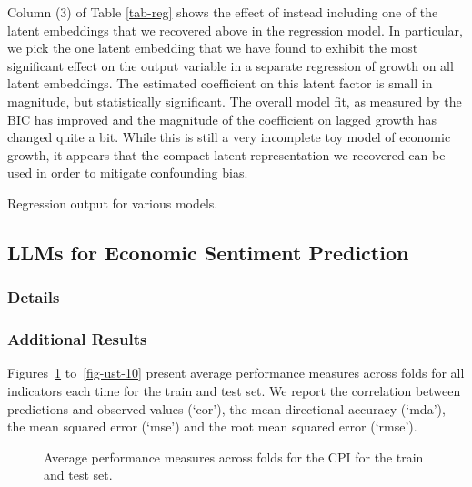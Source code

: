 \documentclass{article}
\theoremstyle{plain}
\theoremstyle{definition}
\theoremstyle{remark}
\begin{document}
Column (3) of Table \ref{tab-reg} shows the effect of instead including one of the latent embeddings that we recovered above in the regression model. In particular, we pick the one latent embedding that we have found to exhibit the most significant effect on the output variable in a separate regression of growth on all latent embeddings. The estimated coefficient on this latent factor is small in magnitude, but statistically significant. The overall model fit, as measured by the BIC has improved and the magnitude of the coefficient on lagged growth has changed quite a bit. While this is still a very incomplete toy model of economic growth, it appears that the compact latent representation we recovered can be used in order to mitigate confounding bias.

\begin{table}
\caption{Regression output for various models.}\label{tab-reg}%

\end{table}

\subsection{LLMs for Economic Sentiment Prediction}

\subsubsection{Details}

\subsubsection{Additional Results}

Figures~\ref{fig-cpi} to~\ref{fig-ust-10} present average performance measures across folds for all indicators each time for the train and test set. We report the correlation between predictions and observed values (`cor'), the mean directional accuracy (`mda'), the mean squared error (`mse') and the root mean squared error (`rmse').
 

\begin{figure}


\caption{\label{fig-cpi}Average performance measures across folds for the CPI for the train and test set.}

\end{figure}%
\end{document}
